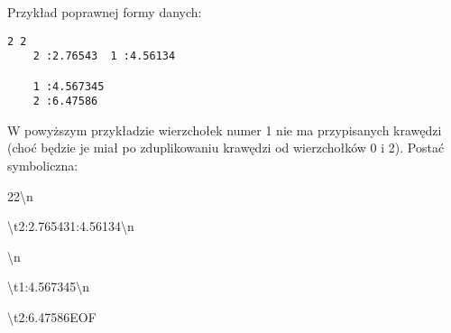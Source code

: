 \documentclass[]{article}
\begin{document}
Przykład poprawnej formy danych:
\begin{verbatim}
2 2
    2 :2.76543  1 :4.56134

    1 :4.567345
    2 :6.47586
\end{verbatim}
W powyższym przykładzie wierzchołek numer 1 nie ma przypisanych krawędzi (choć będzie je miał po zduplikowaniu krawędzi od wierzchołków 0 i 2).
Postać symboliczna:

2\texttt{\verbvisiblespace}2\textbackslash n

\textbackslash t2\texttt{\verbvisiblespace}:2.76543\texttt{\verbvisiblespace}\texttt{\verbvisiblespace}1\texttt{\verbvisiblespace}:4.56134\textbackslash n

\textbackslash n

\textbackslash t1\texttt{\verbvisiblespace}:4.567345\textbackslash n

\textbackslash t2\texttt{\verbvisiblespace}:6.47586EOF
\end{document}
